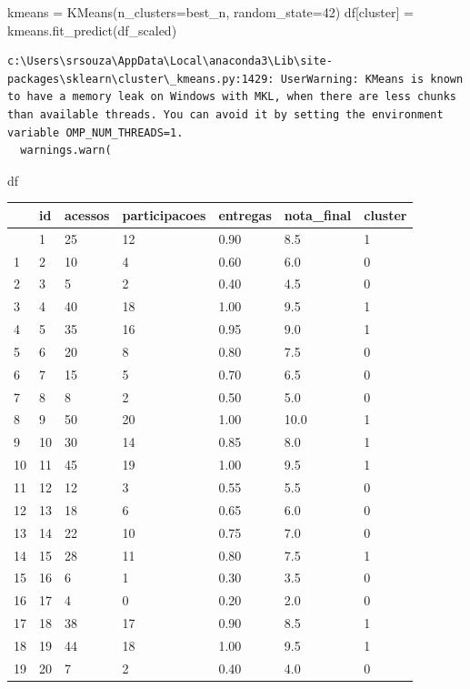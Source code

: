 \documentclass[
  letterpaper,
  DIV=11,
  numbers=noendperiod]{scrartcl}
\newenvironment{Shaded}{\begin{snugshade}}{\end{snugshade}}
\newcommand{\DecValTok}[1]{\textcolor[rgb]{0.68,0.00,0.00}{#1}}
\newcommand{\NormalTok}[1]{\textcolor[rgb]{0.00,0.23,0.31}{#1}}
\newcommand{\OperatorTok}[1]{\textcolor[rgb]{0.37,0.37,0.37}{#1}}
\newcommand{\StringTok}[1]{\textcolor[rgb]{0.13,0.47,0.30}{#1}}
\begin{document}
\begin{Shaded}
\begin{Highlighting}[]
\NormalTok{kmeans }\OperatorTok{=}\NormalTok{ KMeans(n\_clusters}\OperatorTok{=}\NormalTok{best\_n, random\_state}\OperatorTok{=}\DecValTok{42}\NormalTok{)}
\NormalTok{df[}\StringTok{\textquotesingle{}cluster\textquotesingle{}}\NormalTok{] }\OperatorTok{=}\NormalTok{ kmeans.fit\_predict(df\_scaled)}
\end{Highlighting}
\end{Shaded}

\begin{verbatim}
c:\Users\srsouza\AppData\Local\anaconda3\Lib\site-packages\sklearn\cluster\_kmeans.py:1429: UserWarning: KMeans is known to have a memory leak on Windows with MKL, when there are less chunks than available threads. You can avoid it by setting the environment variable OMP_NUM_THREADS=1.
  warnings.warn(
\end{verbatim}

\begin{Shaded}
\begin{Highlighting}[]
\NormalTok{df}
\end{Highlighting}
\end{Shaded}

\begin{longtable}[]{@{}lllllll@{}}
\toprule\noalign{}
& id & acessos & participacoes & entregas & nota\_final & cluster \\
\midrule\noalign{}
\endhead
\bottomrule\noalign{}
\endlastfoot
0 & 1 & 25 & 12 & 0.90 & 8.5 & 1 \\
1 & 2 & 10 & 4 & 0.60 & 6.0 & 0 \\
2 & 3 & 5 & 2 & 0.40 & 4.5 & 0 \\
3 & 4 & 40 & 18 & 1.00 & 9.5 & 1 \\
4 & 5 & 35 & 16 & 0.95 & 9.0 & 1 \\
5 & 6 & 20 & 8 & 0.80 & 7.5 & 0 \\
6 & 7 & 15 & 5 & 0.70 & 6.5 & 0 \\
7 & 8 & 8 & 2 & 0.50 & 5.0 & 0 \\
8 & 9 & 50 & 20 & 1.00 & 10.0 & 1 \\
9 & 10 & 30 & 14 & 0.85 & 8.0 & 1 \\
10 & 11 & 45 & 19 & 1.00 & 9.5 & 1 \\
11 & 12 & 12 & 3 & 0.55 & 5.5 & 0 \\
12 & 13 & 18 & 6 & 0.65 & 6.0 & 0 \\
13 & 14 & 22 & 10 & 0.75 & 7.0 & 0 \\
14 & 15 & 28 & 11 & 0.80 & 7.5 & 1 \\
15 & 16 & 6 & 1 & 0.30 & 3.5 & 0 \\
16 & 17 & 4 & 0 & 0.20 & 2.0 & 0 \\
17 & 18 & 38 & 17 & 0.90 & 8.5 & 1 \\
18 & 19 & 44 & 18 & 1.00 & 9.5 & 1 \\
19 & 20 & 7 & 2 & 0.40 & 4.0 & 0 \\
\end{longtable}
\end{document}
